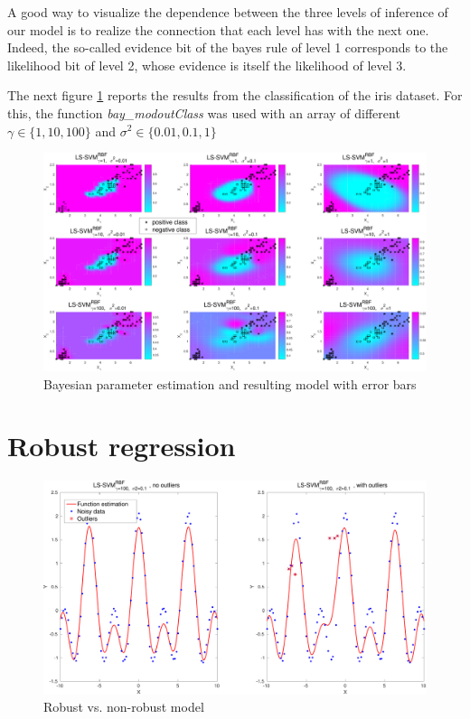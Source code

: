 \documentclass[11pt, a4paper]{article}
\begin{document}
A good way to visualize the dependence between the three levels of
inference of our model is to realize the connection that each level
has with the next one. Indeed, the so-called evidence bit of the bayes
rule of level 1 corresponds to the likelihood bit of level 2, whose
evidence is itself the likelihood of level 3.

The next figure \ref{fig:bayes_iris} reports the results from the
classification of the iris dataset. For this, the function
\emph{bay\_modoutClass} was used with an array of different
$\gamma \in \{1,10,100\}$ and $\sigma^2 \in \{0.01,0.1, 1\}$

\begin{figure}[H]
    \centering
    \includegraphics[scale=.40]{bayes_iris.pdf}
    \caption{Bayesian parameter estimation and resulting model with error bars}
    \label{fig:bayes_iris}
\end{figure}

\section{Robust regression}

\begin{figure}[H]
    \centering
    \includegraphics[scale=.40]{robust_outliers.pdf}
    \caption{Robust vs. non-robust model}
    \label{fig:robust_ouliers}
\end{figure}
\end{document}
